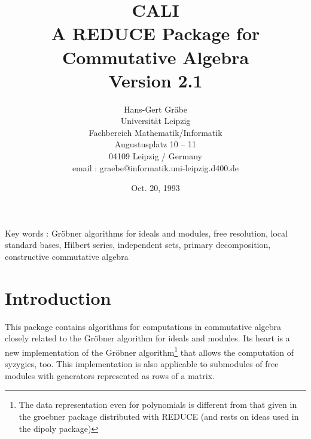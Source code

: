 

\date{Oct. 20, 1993}


\textheight 21cm
\textwidth 15cm 
\voffset -60pt
\hoffset -45pt

\newcommand{\gr}{Gr\"obner }
\newcommand{\x}{{\bf x}}
\newcommand{\ind}[1]{{\em #1}\index{#1}}
\newcommand{\pbx}[1]{\mbox{}\hfill \parbox[t]{12cm}{#1} \pagebreak[3]}
\newcommand{\nl}{\newline \hspace*{5mm}}


\title{CALI\\[20pt] A REDUCE Package for \\ 
    Commutative Algebra \\Version 2.1}

\author{
Hans-Gert Gr\"abe \\[15pt]
Universit\"at Leipzig\\ 
Fachbereich Mathematik/Informatik \\
Augustusplatz 10 -- 11\\
04109 Leipzig / Germany\\[20pt]
email : graebe@informatik.uni-leipzig.d400.de}



\maketitle

\vfill
Key words : \gr algorithms for ideals and modules, free resolution,
local standard bases, Hilbert series, independent sets, primary
decomposition, constructive commutative algebra

\pagebreak

\tableofcontents

\pagebreak

\section{Introduction}

This package contains algorithms for computations in commutative
algebra closely related to the \gr algorithm for ideals and modules.
Its heart is a new implementation of the \gr algorithm\footnote{ The
data representation even for polynomials is different from that given
in the groebner package distributed with REDUCE (and rests on ideas
used in the dipoly package)} that allows the computation of syzygies,
too. This implementation is also applicable to submodules of free
modules with generators represented as rows of a matrix.

